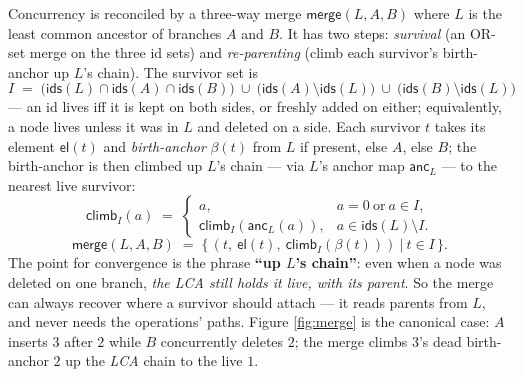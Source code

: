 \documentclass[11pt]{article}
\newcommand{\ids}{\mathsf{ids}}
\newcommand{\anc}{\mathsf{anc}}
\newcommand{\el}{\mathsf{el}}
\newcommand{\climb}{\mathsf{climb}}
\newcommand{\mrg}{\mathsf{merge}}
\newcommand{\lca}{L}
\begin{document}
Concurrency is reconciled by a three-way merge $\mrg(\lca, A, B)$ where $\lca$ is
the least common ancestor of branches $A$ and $B$. It has two steps:
\emph{survival} (an OR-set merge on the three id sets) and \emph{re-parenting}
(climb each survivor's birth-anchor up $\lca$'s chain). The survivor set is
\[
  I \;=\; \bigl(\ids(\lca)\cap\ids(A)\cap\ids(B)\bigr)\ \cup\
          \bigl(\ids(A)\setminus\ids(\lca)\bigr)\ \cup\
          \bigl(\ids(B)\setminus\ids(\lca)\bigr)
\]
--- an id lives iff it is kept on both sides, or freshly added on either;
equivalently, a node lives unless it was in $\lca$ and deleted on a side. Each
survivor $t$ takes its element $\el(t)$ and \emph{birth-anchor} $\beta(t)$ from
$\lca$ if present, else $A$, else $B$; the birth-anchor is then climbed up $\lca$'s
chain --- via $\lca$'s anchor map $\anc_\lca$ --- to the nearest live survivor:
\[
  \climb_I(a) \;=\;
  \begin{cases}
    a, & a = 0 \ \text{or}\ a \in I,\\[2pt]
    \climb_I(\anc_\lca(a)), & a \in \ids(\lca)\setminus I.
  \end{cases}
\]
\[
  \mrg(\lca,A,B) \;=\; \bigl\{\,(t,\ \el(t),\ \climb_I(\beta(t)))\ \big|\ t\in I\,\bigr\}.
\]
The point for convergence is the phrase \textbf{``up $\lca$'s chain''}: even when a
node was deleted on one branch, \emph{the LCA still holds it live, with its
parent}. So the merge can always recover where a survivor should attach --- it
reads parents from $\lca$, and never needs the operations' paths. Figure
\ref{fig:merge} is the canonical case: $A$ inserts $3$ after $2$ while $B$
concurrently deletes $2$; the merge climbs $3$'s dead birth-anchor $2$ up the
\emph{LCA} chain to the live $1$.
\end{document}
